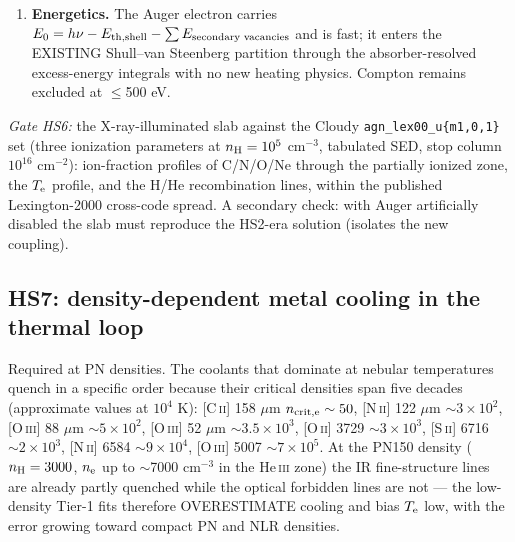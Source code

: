 \documentclass[english,a4paper]{my_memo}
\newcommand{\code}[1]{\texttt{#1}}
\newcommand{\HeIII}{He\,\textsc{iii}}
\newcommand{\Te}{T_{\rm e}}
\newcommand{\nelec}{n_{\rm e}}
\begin{document}
\begin{enumerate}[leftmargin=2em]
  currently solves the strict adjacent-stage chain as a product form.
  Auger couples stage $i$ to $i+2,\,i+3,\dots$, so each element's
  stationary balance becomes a small $n_{\rm stage}\times n_{\rm stage}$
  matrix problem ($M\mathbf{x}=0$ with $\sum_j x_j=1$); the
  partial-pivot elimination already used by \code{nlevel\_mod} is
  reused directly.  The chain path is KEPT as the default and the
  matrix path activates only when an inner-shell channel is present ---
  the off-path stays arithmetically identical, the house rule for every
  extension.
\item \textbf{Energetics.}  The Auger electron carries
  $E_0 = h\nu - E_{\rm th,shell} - \sum E_{\text{secondary vacancies}}$
  and is fast; it enters the EXISTING Shull--van Steenberg partition
  through the absorber-resolved excess-energy integrals with no new
  heating physics.  Compton remains excluded at $\leq$500 eV.
\end{enumerate}

\emph{Gate HS6:} the X-ray-illuminated slab against the Cloudy
\code{agn\_lex00\_u\{m1,0,1\}} set (three ionization parameters at
$n_{\rm H}=10^5$ cm$^{-3}$, tabulated SED, stop column
$10^{16}$ cm$^{-2}$): ion-fraction profiles of C/N/O/Ne through the
partially ionized zone, the $\Te$ profile, and the H/He recombination
lines, within the published Lexington-2000 cross-code spread.  A
secondary check: with Auger artificially disabled the slab must
reproduce the HS2-era solution (isolates the new coupling).

\subsection{HS7: density-dependent metal cooling in the thermal loop}

Required at PN densities.  The coolants that dominate at nebular
temperatures quench in a specific order because their critical
densities span five decades (approximate values at $10^4$ K):
[C\,\textsc{ii}] 158 $\mu$m $n_{\rm crit,e}\sim50$,
[N\,\textsc{ii}] 122 $\mu$m $\sim3\times10^2$,
[O\,\textsc{iii}] 88 $\mu$m $\sim5\times10^2$,
[O\,\textsc{iii}] 52 $\mu$m $\sim3.5\times10^3$,
[O\,\textsc{ii}] 3729 $\sim3\times10^3$,
[S\,\textsc{ii}] 6716 $\sim2\times10^3$,
[N\,\textsc{ii}] 6584 $\sim9\times10^4$,
[O\,\textsc{iii}] 5007 $\sim7\times10^5$.  At the PN150 density
($n_{\rm H}=3000$, $\nelec$ up to $\sim$7000 cm$^{-3}$ in the \HeIII{}
zone) the IR fine-structure lines are already partly quenched while the
optical forbidden lines are not --- the low-density Tier-1 fits
therefore OVERESTIMATE cooling and bias $\Te$ low, with the error
growing toward compact PN and NLR densities.
\end{document}
